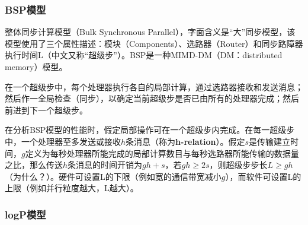 \documentclass{article}
\begin{document}
			\subsubsection{BSP模型}
				整体同步计算模型（Bulk Synchronous Parallel），字面含义是``大''同步模型，该模型使用了三个属性描述：模块（Components）、选路器（Router）和同步路障器执行时间L（中文又称“超级步”）。BSP是一种MIMD-DM（DM：distributed memory）模型。
				
				在一个超级步中，每个处理器执行各自的局部计算，通过选路器接收和发送消息；然后作一全局检查（同步），以确定当前超级步是否已由所有的处理器完成；然后前进到下一个超级步。
				
				在分析BSP模型的性能时，假定局部操作可在一个超级步内完成。在每一超级步中，一个处理器至多发送或接收$h$条消息（称为\textbf{h-relation}）。假定$s$是传输建立时间，$g$定义为每秒处理器所能完成的局部计算数目与每秒选路器所能传输的数据量之比，那么传送$h$条消息的时间开销为$gh+s$，若$gh\geq 2s$，则超级步步长$L\geq gh$（为什么？）。硬件可设置L的下限（例如宽的通信带宽减小$g$），而软件可设置L的上限（例如并行粒度越大，L越大）。
			\subsubsection{logP模型}
				
\end{document}
